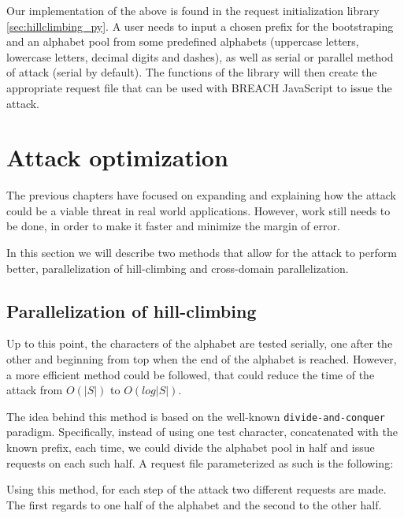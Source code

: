 Our implementation of the above is found in the request initialization library
\ref{sec:hillclimbing_py}. A user needs to input a chosen prefix for the
bootstraping and an alphabet pool from some predefined alphabets (uppercase
letters, lowercase letters, decimal digits and dashes), as well as serial or
parallel method of attack (serial by default). The functions of the library will
then create the appropriate request file that can be used with BREACH JavaScript
to issue the attack.

\section{Attack optimization}\label{sec:optimization}

The previous chapters have focused on expanding and explaining how the attack
could be a viable threat in real world applications. However, work still needs
to be done, in order to make it faster and minimize the margin of error.

In this section we will describe two methods that allow for the attack to
perform better, parallelization of hill-climbing and cross-domain
parallelization.

\subsection{Parallelization of hill-climbing}

Up to this point, the characters of the alphabet are tested serially, one after
the other and beginning from top when the end of the alphabet is reached.
However, a more efficient method could be followed, that could reduce the time
of the attack from \begin{math}O(|S|)\end{math} to
\begin{math}O(log|S|)\end{math}.

The idea behind this method is based on the well-known
\texttt{divide-and-conquer} paradigm. Specifically, instead of using one test
character, concatenated with the known prefix, each time, we could divide the
alphabet pool in half and issue requests on each such half. A request file
parameterized as such is the following:


Using this method, for each step of the attack two different requests are made.
The first regards to one half of the alphabet and the second to the other half.

